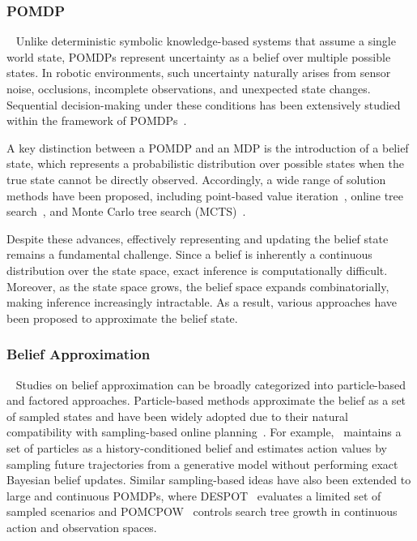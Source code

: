 \subsubsection{POMDP}~\label{rel:pu_pomdp}
Unlike deterministic symbolic knowledge-based systems that assume a single world state, POMDPs represent uncertainty as a belief over multiple possible states. In robotic environments, such uncertainty naturally arises from sensor noise, occlusions, incomplete observations, and unexpected state changes. Sequential decision-making under these conditions has been extensively studied within the framework of POMDPs~\cite{somani2013despot,bai2015intention,cramer2021probabilistic,bravo2019use}.


A key distinction between a POMDP and an MDP is the introduction of a belief state, which represents a probabilistic distribution over possible states when the true state cannot be directly observed. Accordingly, a wide range of solution methods have been proposed, including point-based value iteration~\cite{pineau2003point}, online tree search~\cite{ross2008online}, and Monte Carlo tree search (MCTS)~\cite{silver2010monte}.


Despite these advances, effectively representing and updating the belief state remains a fundamental challenge. Since a belief is inherently a continuous distribution over the state space, exact inference is computationally difficult. Moreover, as the state space grows, the belief space expands combinatorially, making inference increasingly intractable. As a result, various approaches have been proposed to approximate the belief state.


\subsubsection{Belief Approximation}~\label{rel:pu_belief_approx}
Studies on belief approximation can be broadly categorized into particle-based and factored approaches. Particle-based methods approximate the belief as a set of sampled states and have been widely adopted due to their natural compatibility with sampling-based online planning~\cite{doshi2005particle, lim2023optimality}. For example,~\cite{silver2010monte} maintains a set of particles as a history-conditioned belief and estimates action values by sampling future trajectories from a generative model without performing exact Bayesian belief updates. Similar sampling-based ideas have also been extended to large and continuous POMDPs, where DESPOT~\cite{somani2013despot} evaluates a limited set of sampled scenarios and POMCPOW~\cite{sunberg2018pomcpow} controls search tree growth in continuous action and observation spaces.



